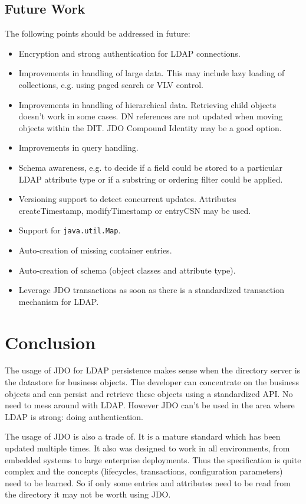 \documentclass[a4paper,11pt,oneside]{article}
\begin{document}
\subsection{Future Work}
The following points should be addressed in future:
\begin{itemize}
\item Encryption and strong authentication for LDAP connections.
\item Improvements in handling of large data. This may include lazy loading of collections, e.g. using paged search or VLV control.
\item Improvements in handling of hierarchical data. Retrieving child objects doesn't work in some cases. DN references are not updated when moving objects within the DIT. JDO Compound Identity may be a good option.
\item Improvements in query handling. 
\item Schema awareness, e.g. to decide if a field could be stored to a particular LDAP attribute type or if a substring or ordering filter could be applied.
\item Versioning support to detect concurrent updates. Attributes createTimestamp, modifyTimestamp or entryCSN may be used.
\item Support for \texttt{java.util.Map}.
\item Auto-creation of missing container entries.
\item Auto-creation of schema (object classes and attribute type).
\item Leverage JDO transactions as soon as there is a standardized transaction mechanism for LDAP.
\end{itemize}

\newpage
\section{Conclusion}

The usage of JDO for LDAP persistence makes sense when the directory server is the datastore for business objects. The developer can concentrate on the business objects and can persist and retrieve these objects using a standardized API. No need to mess around with LDAP. However JDO can't be used in the area where LDAP is strong: doing authentication.

The usage of JDO is also a trade of. It is a mature standard which has been updated multiple times. It also was designed to work in all environments, from embedded systems to large enterprise deployments. Thus the specification is quite complex and the concepts (lifecycles, transactions, configuration parameters) need to be learned. So if only some entries and attributes need to be read from the directory it may not be worth using JDO.
\end{document}
